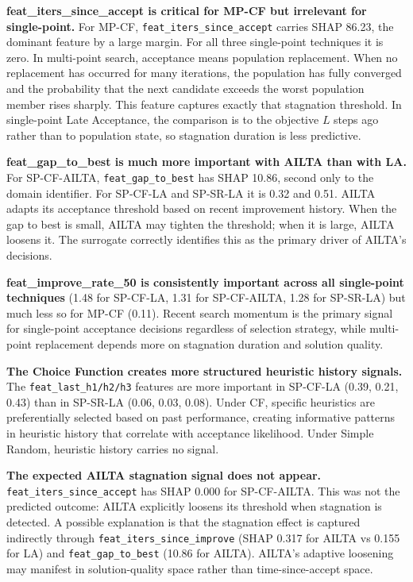 \documentclass[11pt,a4paper]{article}
\begin{document}
\textbf{feat\_iters\_since\_accept is critical for MP-CF but irrelevant for single-point.}
For MP-CF, \texttt{feat\_iters\_since\_accept} carries SHAP 86.23, the dominant feature
by a large margin. For all three single-point techniques it is zero. In multi-point
search, acceptance means population replacement. When no replacement has occurred for
many iterations, the population has fully converged and the probability that the next
candidate exceeds the worst population member rises sharply. This feature captures
exactly that stagnation threshold. In single-point Late Acceptance, the comparison
is to the objective $L$ steps ago rather than to population state, so stagnation
duration is less predictive.

\textbf{feat\_gap\_to\_best is much more important with AILTA than with LA.}
For SP-CF-AILTA, \texttt{feat\_gap\_to\_best} has SHAP 10.86, second only to the
domain identifier. For SP-CF-LA and SP-SR-LA it is 0.32 and 0.51. AILTA adapts its
acceptance threshold based on recent improvement history. When the gap to best is
small, AILTA may tighten the threshold; when it is large, AILTA loosens it. The
surrogate correctly identifies this as the primary driver of AILTA's decisions.

\textbf{feat\_improve\_rate\_50 is consistently important across all single-point techniques}
(1.48 for SP-CF-LA, 1.31 for SP-CF-AILTA, 1.28 for SP-SR-LA) but much less so
for MP-CF (0.11). Recent search momentum is the primary signal for single-point
acceptance decisions regardless of selection strategy, while multi-point replacement
depends more on stagnation duration and solution quality.

\textbf{The Choice Function creates more structured heuristic history signals.}
The \texttt{feat\_last\_h1/h2/h3} features are more important in SP-CF-LA (0.39,
0.21, 0.43) than in SP-SR-LA (0.06, 0.03, 0.08). Under CF, specific heuristics
are preferentially selected based on past performance, creating informative patterns
in heuristic history that correlate with acceptance likelihood. Under Simple Random,
heuristic history carries no signal.

\textbf{The expected AILTA stagnation signal does not appear.}
\texttt{feat\_iters\_since\_accept} has SHAP 0.000 for SP-CF-AILTA. This was
not the predicted outcome: AILTA explicitly loosens its threshold when stagnation is
detected. A possible explanation is that the stagnation effect is captured indirectly
through \texttt{feat\_iters\_since\_improve} (SHAP 0.317 for AILTA vs 0.155 for LA)
and \texttt{feat\_gap\_to\_best} (10.86 for AILTA). AILTA's adaptive loosening may
manifest in solution-quality space rather than time-since-accept space.
\end{document}
